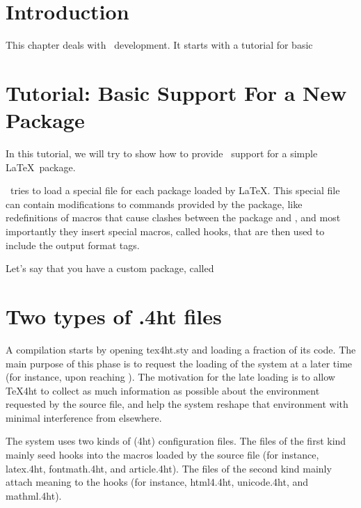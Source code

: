 \section{Introduction}

This chapter deals with \texfourht\ development. It starts with a tutorial for basic
\section{Tutorial: Basic Support For a New Package}

In this tutorial, we will try to show how to provide \texfourht\ support for a
simple \LaTeX\ package. 

\texfourht\ tries to load a special  file for each package loaded
by \LaTeX. This special file can contain modifications to commands provided by the package, like 
redefinitions of macros that cause clashes between the package and \texfourht, and most importantly
they insert special macros, called hooks, that are then used to include the output format tags.

Let's say that you have a custom package, called 




\section{Two types of .4ht files}


A compilation starts by opening tex4ht.sty and loading a fraction of its code.
The main purpose of this phase is to request the loading of the system at a
later time (for instance, upon reaching \texcommand{}). The motivation for
the late loading is to allow TeX4ht to collect as much information as possible
about the environment requested by the source file, and help the system reshape
that environment with minimal interference from elsewhere.

The system uses two kinds of (4ht) configuration files. The files of the first
kind mainly seed hooks into the macros loaded by the source file (for instance,
latex.4ht, fontmath.4ht, and article.4ht). The files of the second kind mainly
attach meaning to the hooks (for instance, html4.4ht, unicode.4ht, and
mathml.4ht).

